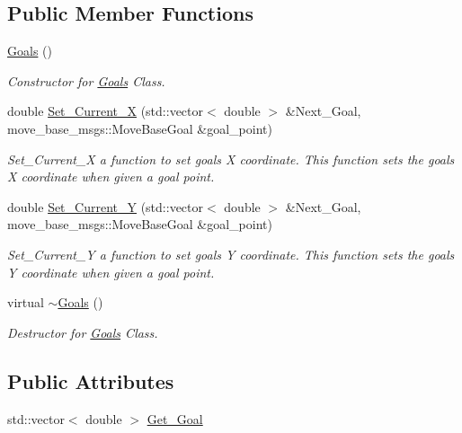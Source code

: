 \subsection*{Public Member Functions}
\begin{DoxyCompactItemize}
\item 
\hyperlink{classGoals_a6b686b508f96f56d28ab0c1f8c15f5b2}{Goals} ()\hypertarget{classGoals_a6b686b508f96f56d28ab0c1f8c15f5b2}{}\label{classGoals_a6b686b508f96f56d28ab0c1f8c15f5b2}

\begin{DoxyCompactList}\small\item\em Constructor for \hyperlink{classGoals}{Goals} Class. \end{DoxyCompactList}\item 
double \hyperlink{classGoals_a587309b801df2c5c805e3c8c1bfddfea}{Set\+\_\+\+Current\+\_\+X} (std\+::vector$<$ double $>$ \&Next\+\_\+\+Goal, move\+\_\+base\+\_\+msgs\+::\+Move\+Base\+Goal \&goal\+\_\+point)
\begin{DoxyCompactList}\small\item\em Set\+\_\+\+Current\+\_\+X a function to set goal\textquotesingle{}s X coordinate. This function sets the goal\textquotesingle{}s X coordinate when given a goal point. \end{DoxyCompactList}\item 
double \hyperlink{classGoals_a815209daf633d7a3a64a1a3a5605cdd0}{Set\+\_\+\+Current\+\_\+Y} (std\+::vector$<$ double $>$ \&Next\+\_\+\+Goal, move\+\_\+base\+\_\+msgs\+::\+Move\+Base\+Goal \&goal\+\_\+point)
\begin{DoxyCompactList}\small\item\em Set\+\_\+\+Current\+\_\+Y a function to set goal\textquotesingle{}s Y coordinate. This function sets the goal\textquotesingle{}s Y coordinate when given a goal point. \end{DoxyCompactList}\item 
virtual \hyperlink{classGoals_a3a48604490cad549dfbb30fbedbf3d54}{$\sim$\+Goals} ()\hypertarget{classGoals_a3a48604490cad549dfbb30fbedbf3d54}{}\label{classGoals_a3a48604490cad549dfbb30fbedbf3d54}

\begin{DoxyCompactList}\small\item\em Destructor for \hyperlink{classGoals}{Goals} Class. \end{DoxyCompactList}\end{DoxyCompactItemize}
\subsection*{Public Attributes}
\begin{DoxyCompactItemize}
\item 
std\+::vector$<$ double $>$ \hyperlink{classGoals_a55d63f2dacadc111b312e6f22f7a33ba}{Get\+\_\+\+Goal}
\end{DoxyCompactItemize}
